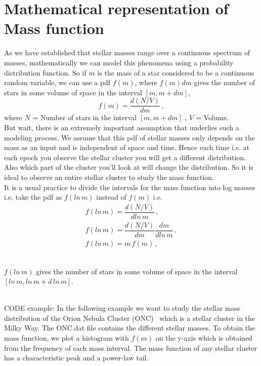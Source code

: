\documentclass{article}
\begin{document}
\section{Mathematical representation of  Mass function}
As we have established that stellar masses range over a continuous spectrum of masses, mathematically we can model this phenomena using a probability distribution function. 
So if $m$ is the mass of a star considered to be a continuous random variable, we can use a pdf $f(m)$, where $f(m)dm$ gives the number of stars in some volume of space in the interval $[m,m + dm]$,
\\

\begin{equation}
f(m) = \dfrac{d(N/V)}{dm}\,,
\end{equation}
where $N$ = Number of stars in the interval $[m,m+dm]$ , $V$ = Volume.
\\
But wait, there is an extremely important assumption that underlies such a modeling process. We assume that this pdf of stellar masses only depends on the mass as an input and is independent of space and time. Hence each time i.e. at each epoch you observe the stellar cluster you will get a different distribution. Also which part of the cluster you'll look at will change the distribution. So it is ideal to observe an entire stellar cluster to study the mass function. 
\\
It is a usual practice to divide the intervals for the mass function into log masses  i.e. take the pdf as $f(ln\,m)$  instead of $f(m)$ i.e. 
\begin{eqnarray}
f(ln\,m) = \dfrac{d(N/V)}{dln\,m}\, ,\\
f(ln\,m) = \dfrac{d(N/V)}{dm} \dfrac{dm}{dln\,m}\, , \\
f(ln\,m) = m\,f(m)\, , 
\end{eqnarray}

\\
$f(ln\,m)$ gives the number of stars in some volume of space in the interval $[ln\,m,ln\,m + d\,ln\,m]$.

\\
CODE example: In the following example we want to study the stellar mass distribution of the Orion Nebula Cluster (ONC)~\cite{Hillenbrand1997, DaRio2012} which is a stellar cluster in the Milky Way. The ONC.dat file contains the different stellar masses. To obtain the mass function, we plot a histogram with $f(m)$ on the y-axis which is obtained from the frequency of each mass interval.  The mass function of any stellar cluster has a characteristic peak and a power-law tail. 
\end{document}
